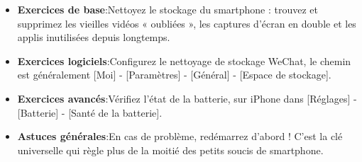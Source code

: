 
\begin{itemize}
  \item \textbf{Exercices de base}:Nettoyez le stockage du smartphone : trouvez et supprimez les vieilles vidéos « oubliées », les captures d’écran en double et les applis inutilisées depuis longtemps.
  \item \textbf{Exercices logiciels}:Configurez le nettoyage de stockage WeChat, le chemin est généralement [Moi] - [Paramètres] - [Général] - [Espace de stockage].
  \item \textbf{Exercices avancés}:Vérifiez l’état de la batterie, sur iPhone dans [Réglages] - [Batterie] - [Santé de la batterie].
  \item \textbf{Astuces générales}:En cas de problème, redémarrez d’abord ! C’est la clé universelle qui règle plus de la moitié des petits soucis de smartphone.
\end{itemize}
